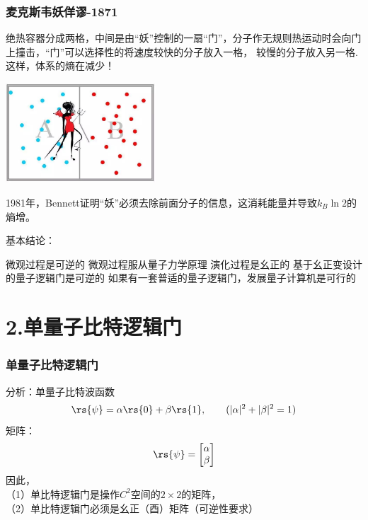 \begin{frame}{}
        \frametitle{麦克斯韦妖佯谬-1871}
        绝热容器分成两格，中间是由“妖”控制的一扇“门”，分子作无规则热运动时会向门上撞击，“门”可以选择性的将速度较快的分子放入一格，
        较慢的分子放入另一格. 这样，体系的熵在减少！\\
       \begin{center}
        \includegraphics[width=0.42\textwidth]{figs/12.png}     
       \end{center}   
       1981年，Bennett证明“妖”必须去除前面分子的信息，这消耗能量并导致$k_B\ln2$的熵增。 
\end{frame} 

\begin{frame}
    基本结论：\\
   \begin{itemize}
       \IItem 微观过程是可逆的
       \IItem 微观过程服从量子力学原理
       \IItem 演化过程是幺正的
       \IItem 基于幺正变设计的量子逻辑门是可逆的
       \IItem 如果有一套普适的量子逻辑门，发展量子计算机是可行的
   \end{itemize} 
\end{frame} 

\section{2.单量子比特逻辑门}

\begin{frame}
    \frametitle{单量子比特逻辑门}   
    {\Bullet} 分析：单量子比特波函数
\[\rs{\psi} =\alpha\rs{0}+\beta\rs{1}, \qquad (|\alpha|^2+|\beta|^2=1)\]
矩阵：
 \[ \rs{\psi}=\begin{bmatrix}
    \alpha \\
    \beta
 \end{bmatrix}\]
 因此，\\
 （1）单比特逻辑门是操作$C^2$空间的$2\times 2$的矩阵，\\
 （2）单比特逻辑门必须是幺正（酉）矩阵（可逆性要求）
\end{frame} 

